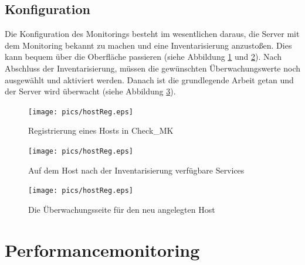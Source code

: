 \documentclass[12pt,a4paper,parskip,listof=totoc,bibliography=totoc]{scrreprt}
\begin{document}
	\subsection{Konfiguration}
	Die Konfiguration des Monitorings besteht im wesentlichen daraus, die Server mit dem Monitoring bekannt zu machen und eine Inventarisierung anzustoßen. Dies kann bequem über die Oberfläche passieren (siehe Abbildung \ref{fig:hostreg} und \ref{fig:hostservices}). Nach Abschluss der Inventarisierung, müssen die gewünschten Überwachungswerte noch ausgewählt und aktiviert werden. Danach ist die grundlegende Arbeit getan und der Server wird überwacht (siehe Abbildung \ref{fig:monitoring}).
	\begin{figure}[h!]
		\centering
		\texttt{[image: pics/hostReg.eps]}
		\caption[Registrierung eines Hosts]{Registrierung eines Hosts in Check\_MK}
		\label{fig:hostreg}
	\end{figure}
	\begin{figure}[h!]
		\centering
		\texttt{[image: pics/hostReg.eps]}
		\caption[Auf dem Host verfügbare Services]{Auf dem Host nach der Inventarisierung verfügbare Services}
		\label{fig:hostservices}
	\end{figure}
	\begin{figure}[h!]
		\centering
		\texttt{[image: pics/hostReg.eps]}
		\caption[Die Überwachungsseite für den neu angelegten Host]{Die Überwachungsseite für den neu angelegten Host}
		\label{fig:monitoring}
	\end{figure}
	\section{Performancemonitoring}
\end{document}

